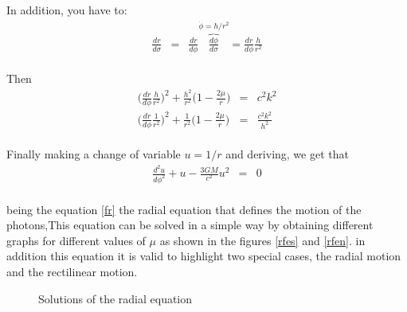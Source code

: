 \documentclass[letterpaper,11pt,onecolumn]{article}
\begin{document}
In addition, you have to:
\begin{eqnarray*}
      \frac{dr}{d\sigma}&=&\frac{dr}{d\phi}\overbrace{\frac{d\phi}{d\sigma}}^{\dot{\phi}=h/r^{2}}=\frac{dr}{d\phi}\frac{h}{r^{2}}
\end{eqnarray*}\\
Then
\begin{eqnarray}
    \Big(\frac{dr}{d\phi}\frac{h}{r^{2}}\Big)^{2}+\frac{h^2}{r^{2}}\Big( 1- \frac{2\mu}{r}\Big)&=& c^{2}k^{2} \nonumber\\
    \Big(\frac{dr}{d\phi}\frac{1}{r^{2}}\Big)^{2}+\frac{1}{r^{2}}\Big( 1- \frac{2\mu}{r}\Big)&=&\frac{c^{2}k^{2}}{h^{2}}\label{aste} 
\end{eqnarray}\\
Finally making a change of variable $u=1/r$ and deriving, we get that
\begin{eqnarray}
    \frac{d^{2}u}{d\phi^{2}}+u-\frac{3GM}{c^{2}}u^{2}&=&0 \label{fr}
\end{eqnarray}\\ 
being the equation \ref{fr} the radial equation that defines the motion of the photons,This equation can be solved in a simple way by obtaining different graphs for different values of $\mu$ as shown in the figures \ref{rfes} and \ref{rfen}. in addition this equation it is valid to highlight two special cases, the radial motion and the rectilinear motion. 
\begin{figure}[h]
\centering
{}
\caption{Solutions of the radial equation}
\end{figure}
\end{document}
